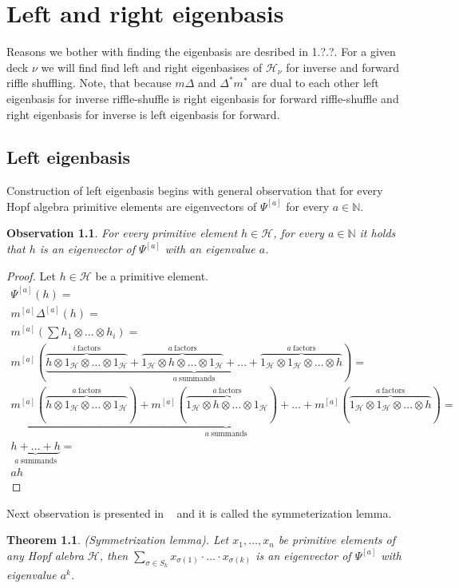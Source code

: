 \documentclass[a4paper, 12pt]{report}
\newtheorem{observation}{Observation}
\newtheorem{theorem}{Theorem}
\begin{document}
\chapter{Left and right eigenbasis}

Reasons we bother with finding the eigenbasis are desribed in 1.?.?. For a given deck $\nu$ 
we will find find left and right eigenbasises of $\mathcal{H}_\nu$ for inverse and forward riffle shuffling. 
Note, that because 
$m\Delta$ and $\Delta^*m^*$ are dual to each other left eigenbasis for inverse riffle-shuffle is right 
eigenbasis for forward riffle-shuffle and right eigenbasis for inverse is left eigenbasis for forward.

\section{Left eigenbasis}
Construction of left eigenbasis begins with general observation that for every Hopf algebra 
primitive elements are eigenvectors of $\Psi^{[a]}$ for every $a \in \mathbb{N}$. 
\begin{observation}
For every primitive element $h \in \mathcal{H}$, for every $a \in \mathbb{N}$ it holds that $h$ is an 
eigenvector of $\Psi^{[a]}$ with an eigenvalue $a$.
\end{observation}
\begin{proof}
Let $h \in \mathcal{H}$ be a primitive element.
\begin{gather*}
\Psi^{[a]}(h) = \\ m^{[a]}\Delta^{[a]}(h) = \\
m^{[a]}(\sum h_1 \otimes \dots \otimes h_i) = \\
m^{[a]}(\underbrace{\overbrace{h \otimes 1_\mathcal{H} \otimes \dots \otimes 1_\mathcal{H}}^{i\ 
\mathrm{factors}} + 
\overbrace{1_\mathcal{H} \otimes h \otimes \dots \otimes 1_\mathcal{H}}^{a\ \mathrm{factors}} +
\dots + 
\overbrace{1_\mathcal{H} \otimes 1_\mathcal{H} \otimes \dots \otimes h}^{a\ \mathrm{factors}}}_{a\ 
\mathrm{summands}} ) = \\
\underbrace{m^{[a]}(\overbrace{h \otimes 1_\mathcal{H} \otimes \dots \otimes 1_\mathcal{H}}^{a\ 
\mathrm{factors}}) + 
m^{[a]}(\overbrace{1_\mathcal{H} \otimes h \otimes \dots \otimes 1_\mathcal{H}}^{a\ \mathrm{factors}}) +
\dots + 
m^{[a]}(\overbrace{1_\mathcal{H} \otimes 1_\mathcal{H} \otimes \dots \otimes h}^{a\ \mathrm{factors}})}_{a\ 
\mathrm{summands}} = \\
\underbrace{h + \dots + h}_{a\ \mathrm{summands}} = \\
ah 
\end{gather*}

\end{proof}
Next observation is presented in ~\cite{Diaconis2014} and it is called the symmeterization lemma.
\begin{theorem}
(Symmetrization lemma). Let $x_1, \dots, x_n$ be primitive elements of any Hopf alebra $\mathcal{H}$, then 
$\displaystyle\sum_{\sigma \in S_k} x_{\sigma(1)}\cdot\ldots\cdot x_{\sigma(k)}$ is an eigenvector of 
$\Psi^{[a]}$ with eigenvalue $a^k$.
\end{theorem}
\end{document}
